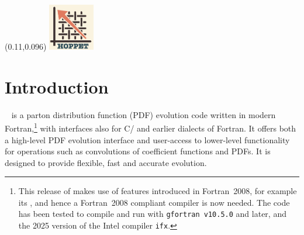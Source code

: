 \documentclass[preprint,1p,a4paper,11pt]{elsarticle}
\begin{document}
\begin{frontmatter}
\begin{keyword}


\end{keyword}
  \begin{textblock*}{2cm}(0.11\textwidth,0.096\textheight)  %
    \includegraphics[width=2cm]{logo/2025-09-logo.png}
  \end{textblock*}
\end{frontmatter}
\newpage
\tableofcontents
\section{Introduction}


\hoppet~\cite{Salam:2008qg} is a parton distribution function (PDF)
evolution code written in modern Fortran,\footnote{This release of
\hoppet makes use of features introduced in Fortran~2008, for example
its , and hence a Fortran~2008 compliant
compiler is now needed. The code has been tested to compile and run
with \texttt{gfortran v10.5.0} and later, and the 2025 version of the
Intel compiler \texttt{ifx}.}  with interfaces also for C/\CPP{} and
earlier dialects of Fortran.
%
It offers both a high-level PDF evolution interface and user-access to
lower-level functionality for operations such as convolutions of
coefficient functions and PDFs.
%
It is designed to provide flexible, fast and accurate evolution.
\end{document}
